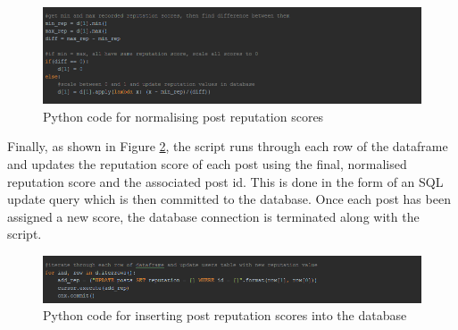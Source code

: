 \begin{figure}[H]
\centering
\includegraphics[width=\linewidth]{Images/Implementation/PostRepPython2}
\caption{Python code for normalising post reputation scores}
\label{fig:PostRepPython2}
\end{figure}

Finally, as shown in Figure \ref{fig:PostRepPython3}, the script runs through each row of the dataframe and updates the reputation score of each post using the final, normalised reputation score and the associated post id. This is done in the form of an SQL update query which is then committed to the database. Once each post has been assigned a new score, the database connection is terminated along with the script.

\begin{figure}[H]
\centering
\includegraphics[width=\linewidth]{Images/Implementation/PostRepPython3}
\caption{Python code for inserting post reputation scores into the database}
\label{fig:PostRepPython3}
\end{figure}

